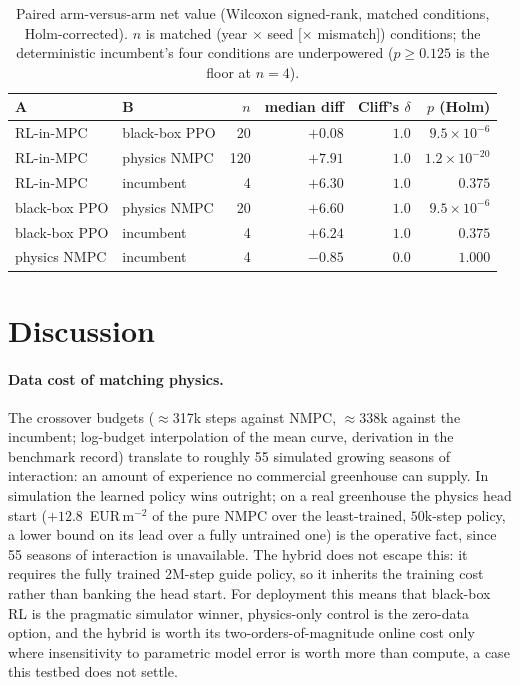 \documentclass[11pt]{article}
\begin{document}
\begin{table}[t]
  \centering\small
  \caption{Paired arm-versus-arm net value (Wilcoxon signed-rank, matched conditions,
  Holm-corrected). $n$ is matched (year $\times$ seed $[\times$ mismatch$]$) conditions;
  the deterministic incumbent's four conditions are underpowered ($p \ge 0.125$ is the
  floor at $n = 4$).}
  \label{tab:stats}
  \begin{tabular}{llrrrr}
    \toprule
    A & B & $n$ & median diff & Cliff's $\delta$ & $p$ (Holm) \\
    \midrule
    RL-in-MPC & black-box PPO & 20 & $+0.08$ & $1.0$ & $9.5\times10^{-6}$ \\
    RL-in-MPC & physics NMPC  & 120 & $+7.91$ & $1.0$ & $1.2\times10^{-20}$ \\
    RL-in-MPC & incumbent     & 4  & $+6.30$ & $1.0$ & $0.375$ \\
    black-box PPO & physics NMPC & 20 & $+6.60$ & $1.0$ & $9.5\times10^{-6}$ \\
    black-box PPO & incumbent  & 4  & $+6.24$ & $1.0$ & $0.375$ \\
    physics NMPC & incumbent  & 4  & $-0.85$ & $0.0$ & $1.000$ \\
    \bottomrule
  \end{tabular}
\end{table}

\section{Discussion}\label{sec:discussion}

\paragraph{Data cost of matching physics.} The crossover budgets ($\approx$317k steps against NMPC, $\approx$338k against the incumbent; log-budget interpolation of the mean curve, derivation in the benchmark record) translate to roughly 55 simulated growing seasons of interaction: an amount of experience no commercial greenhouse can supply. In simulation the learned policy wins outright; on a real greenhouse the physics head start ($+12.8$~EUR\,m$^{-2}$ of the pure NMPC over the least-trained, $50$k-step policy, a lower bound on its lead over a fully untrained one) is the operative fact, since 55 seasons of interaction is unavailable. The hybrid does not escape this: it requires the fully trained 2M-step guide policy, so it inherits the training cost rather than banking the head start. For deployment this means that black-box RL is the pragmatic simulator winner, physics-only control is the zero-data option, and the hybrid is worth its two-orders-of-magnitude online cost only where insensitivity to parametric model error is worth more than compute, a case this testbed does not settle.
\end{document}
